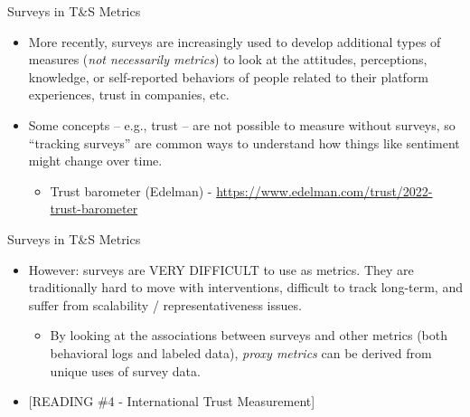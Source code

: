 \documentclass[nobackground,dvipsnames,table]{beamer}
\begin{document}
\begin{frame}{Surveys in T\&S Metrics}

\begin{itemize}
    \item More recently, surveys are increasingly used to develop additional types of measures (\emph{not necessarily metrics}) to look at the attitudes, perceptions, knowledge, or self-reported behaviors of people related to their platform experiences, trust in companies, etc.
    \item Some concepts – e.g., trust – are not possible to measure without surveys, so “tracking surveys” are common ways to understand how things like sentiment might change over time.

    \begin{itemize}
        \item Trust barometer (Edelman) - \href{https://www.edelman.com/trust/2022-trust-barometer}{https://www.edelman.com/trust/2022-trust-barometer}
    \end{itemize}
\end{itemize}
\end{frame}

\begin{frame}{Surveys in T\&S Metrics}

\begin{itemize}
    \item However: surveys are VERY DIFFICULT to use as metrics. They are traditionally hard to move with interventions, difficult to track long-term, and suffer from scalability / representativeness issues. 

    \begin{itemize}
        \item By looking at the associations between surveys and other metrics (both behavioral logs and labeled data), \emph{proxy metrics} can be derived from unique uses of survey data.
    \end{itemize}

    \item {[READING \#4 - International Trust Measurement]}
\end{itemize}
\end{frame}
\end{document}
